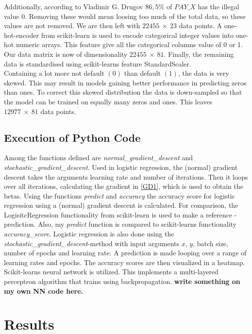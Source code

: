 \documentclass[a4paper,11pt,twocolumn]{article}
\begin{document}
Additionally, according to Vladimir G. Drugov \cite{vladimir} $86,5 \%$ of $PAY\_X$ has the illegal value 0. 
Removing these would mean loosing too much of the total data, so these values are not removed. We are then left with $22455\: \times\: 23$ data points.
A one-hot-encoder from scikit-learn is used to encode categorical integer values into one-hot numeric arrays. This feature give all the categorical columns value of 0 or 1. Our data matrix is now of dimensionality $22455\: \times\: 81$. Finally, the remaining data is standardised using scikit-learns feature StandardScaler. 
\\ 
Containing a lot more not default $(0)$ than default $(1)$, the data is very skewed. This may result in models gaining better performance in predicting zeros than ones. To correct this skewed distribution the data is down-sampled so that the model can be trained on equally many zeros and ones. This leaves $12977\: \times\: 81$ data points. 

\subsection{Execution of Python Code}

Among the functions defined are \textit{normal\_gradient\_descent} and \textit{stochastic\_gradient\_descent}. Used in logistic regression, the (normal) gradient descent takes the arguments learning rate and number of iterations. Then it loops over all iterations, calculating the gradient in \eqref{GD1}, which is used to obtain the betas. Using the functions \textit{predict} and \textit{accuracy} the accuracy score for logistic regression using a (normal) gradient descent is calculated. For comparison, the LogisitcRegression functionality from scikit-learn is used to make a reference - prediction. Also, my \textit{predict} function is compared to scikit-learns functionality \textit{accuracy\_score}. 
Logistic regression is also done using the \textit{stochastic\_gradient\_descent}-method with input arguments $x$, $y$, batch size, number of epochs and learning rate. A prediction is made looping over a range of learning rates and epochs. The accuracy scores are then visualized in a heatmap.
Scikit-learns neural network is utilized. This implements a multi-layered perceptron algorithm that trains using backpropagation. 
\textbf{write something on my own NN code here.}    

\section{Results}
\end{document}
